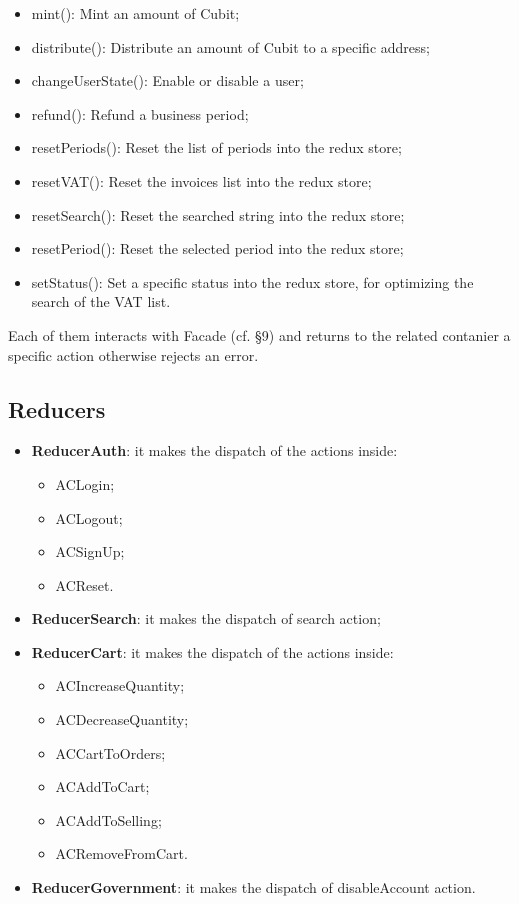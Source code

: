 \begin{itemize}
\begin{itemize}
		\item mint(): Mint an amount of Cubit;
		\item distribute(): Distribute an amount of Cubit to a specific address;
		\item changeUserState(): Enable or disable a user;
		\item refund(): Refund a business period;
		\item resetPeriods(): Reset the list of periods into the redux store;
		\item resetVAT(): Reset the invoices list into the redux store;
		\item resetSearch(): Reset the searched string into the redux store;
		\item resetPeriod(): Reset the selected period into the redux store;
		\item setStatus(): Set a specific status into the redux store, for optimizing the search of the VAT list.
	\end{itemize}
Each of them interacts with Facade (cf. §9) and returns to the related contanier a specific action otherwise rejects an error.
\subsection{Reducers}
\begin{itemize}
	\item \textbf{ReducerAuth}: it makes the dispatch of the actions inside:
	\begin{itemize}
		\item ACLogin;
		\item ACLogout;
		\item ACSignUp;
		\item ACReset.
	\end{itemize}
	\item \textbf{ReducerSearch}: it makes the dispatch of search action;
	\item \textbf{ReducerCart}: it makes the dispatch of the actions inside:
	\begin{itemize}
		\item ACIncreaseQuantity;
		\item ACDecreaseQuantity;
		\item ACCartToOrders;
		\item ACAddToCart;
		\item ACAddToSelling;
		\item ACRemoveFromCart.
	\end{itemize}
	\item \textbf{ReducerGovernment}: it makes the dispatch of disableAccount action.
\end{itemize}

\end{itemize}
